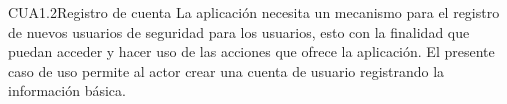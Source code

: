 
\begin{UseCase}{CUA1.2}{Registro de cuenta}
    {
	La aplicación necesita un mecanismo para el registro de nuevos usuarios de seguridad para los usuarios, esto con la finalidad que puedan acceder y hacer uso de las acciones que ofrece la aplicación. El presente caso de uso permite al actor crear una cuenta de usuario registrando la información básica.
    }

\end{UseCase}
